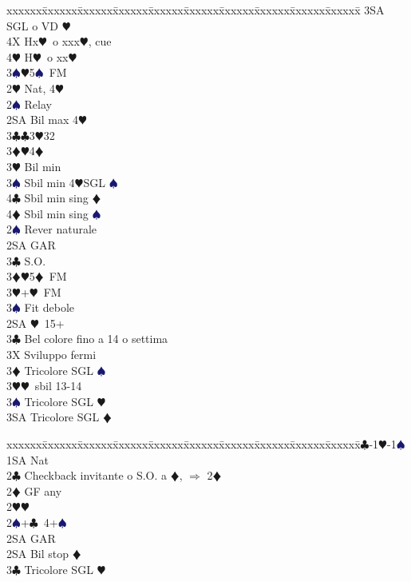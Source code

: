 \documentclass[a4paper,italian]{article}
\newcommand{\BC}{\textcolor{OliveGreen}{$\clubsuit$}}
\newcommand{\BD}{\textcolor{RedOrange}{$\vardiamondsuit$}}
\newcommand{\BH}{\textcolor{Red2}{$\varheartsuit${}}}
\newcommand{\BS}{\textcolor{MidnightBlue}{$\spadesuit${}}}
\newenvironment{bidtable}
{\begin{tabbing}

    xxxxxx\=xxxxxx\=xxxxxx\=xxxxxx\=xxxxxx\=xxxxxx\=xxxxxx\=xxxxxx\=xxxxxx\=xxxxxx\=\kill}
{\end{tabbing} }%
\begin{document}
\begin{multicols}{2}
\begin{bidtable}
        3SA \> SGL o VD \BH\\
        4X \> Hx\BH\ o xxx\BH, cue\\
        4\BH \> H\BH\ o xx\BH\-\\
        3\BS {}\BH 5\BS\ FM\-\\
        2\BH \> Nat, 4\BH \+\\
        2\BS \> Relay\+\\
        2SA \> Bil max 4\BH\\
        3\BC {}\BC 3\BH 32\\
        3\BD {}\BH4\BD\+\\
        3\BH \> Bil min\\
        3\BS \> Sbil min 4\BH SGL \BS\\
        4\BC \> Sbil min sing \BD \\
        4\BD \> Sbil min sing \BS \-\-\\
        2\BS \> Rever naturale\+\\
        2SA \> GAR\\
        3\BC \> S.O.\\
        3\BD {}\BH 5\BD\ FM\\
        3\BH {}+\BH\ FM\\
        3\BS \> Fit debole\-\\
        2SA \BH\ 15+\\
        3\BC \> Bel colore fino a 14 o settima\+\\
        3X \> Sviluppo fermi\-\\
        3\BD \> Tricolore SGL \BS \\
        3\BH {}\BH\ sbil 13-14\\
        3\BS \> Tricolore SGL \BH \\
        3SA \> Tricolore SGL \BD \-
    \end{bidtable}
    \bigbreak
    \begin{bidtable}
        1\BC-1\BH-1\BS\+\\
        1SA \> Nat\\
        2\BC \> Checkback invitante o S.O. a \BD , $\Rightarrow$ 2\BD \\
        2\BD \> GF any\+\\
        2\BH {}\BH \\
        2\BS {}+\BC\ 4+\BS \+\\
        2SA \> GAR\-\\
        2SA \> Bil stop \BD \\
        3\BC \> Tricolore SGL \BH \\

\end{bidtable}
\end{multicols}
\end{document}
